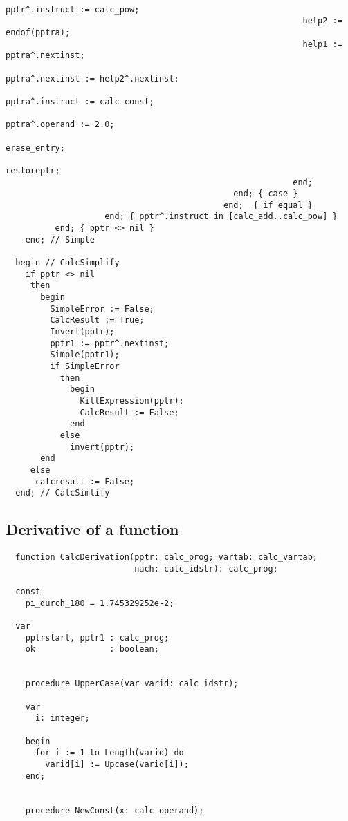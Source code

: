 \begin{refsection}
\begin{lstlisting}
                                                            pptr^.instruct := calc_pow;
                                                            help2 := endof(pptra);
                                                            help1 := pptra^.nextinst;
                                                            pptra^.nextinst := help2^.nextinst;
                                                            pptra^.instruct := calc_const;
                                                            pptra^.operand := 2.0;
                                                            erase_entry;
                                                            restoreptr;
                                                          end;
                                              end; { case }
                                            end;  { if equal }
                    end; { pptr^.instruct in [calc_add..calc_pow] }
          end; { pptr <> nil }
    end; // Simple

  begin // CalcSimplify
    if pptr <> nil
     then
       begin
         SimpleError := False;
         CalcResult := True;
         Invert(pptr);
         pptr1 := pptr^.nextinst;
         Simple(pptr1);
         if SimpleError
           then
             begin
               KillExpression(pptr);
               CalcResult := False;
             end
           else
             invert(pptr);
       end
     else
      calcresult := False;
  end; // CalcSimlify
\end{lstlisting}

\subsection{Derivative of a function}

\begin{lstlisting}
  function CalcDerivation(pptr: calc_prog; vartab: calc_vartab;
                          nach: calc_idstr): calc_prog;

  const
    pi_durch_180 = 1.745329252e-2;

  var
    pptrstart, pptr1 : calc_prog;
    ok               : boolean;


    procedure UpperCase(var varid: calc_idstr);

    var
      i: integer;

    begin
      for i := 1 to Length(varid) do
        varid[i] := Upcase(varid[i]);
    end;


    procedure NewConst(x: calc_operand);


\end{lstlisting}
\end{refsection}
